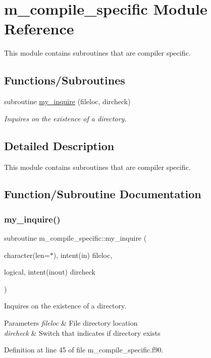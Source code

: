 \hypertarget{namespacem__compile__specific}{}\section{m\+\_\+compile\+\_\+specific Module Reference}
\label{namespacem__compile__specific}


This module contains subroutines that are compiler specific.  


\subsection*{Functions/\+Subroutines}
\begin{DoxyCompactItemize}
\item 
subroutine \hyperlink{namespacem__compile__specific_aa7f14da74305c1d061ce326b16a3263e}{my\+\_\+inquire} (fileloc, dircheck)
\begin{DoxyCompactList}\small\item\em Inquires on the existence of a directory. \end{DoxyCompactList}\end{DoxyCompactItemize}


\subsection{Detailed Description}
This module contains subroutines that are compiler specific. 

\subsection{Function/\+Subroutine Documentation}
\mbox{\label{namespacem__compile__specific_aa7f14da74305c1d061ce326b16a3263e}} 
\subsubsection{\texorpdfstring{my\+\_\+inquire()}{my\_inquire()}}
{\footnotesize\ttfamily subroutine m\+\_\+compile\+\_\+specific\+::my\+\_\+inquire (\begin{DoxyParamCaption}\item[{character(len=$\ast$), intent(in)}]{fileloc,  }\item[{logical, intent(inout)}]{dircheck }\end{DoxyParamCaption})}



Inquires on the existence of a directory. 


\begin{DoxyParams}{Parameters}
{\em fileloc} & File directory location \\
\hline
{\em dircheck} & Switch that indicates if directory exists \\
\hline
\end{DoxyParams}


Definition at line 45 of file m\+\_\+compile\+\_\+specific.\+f90.

